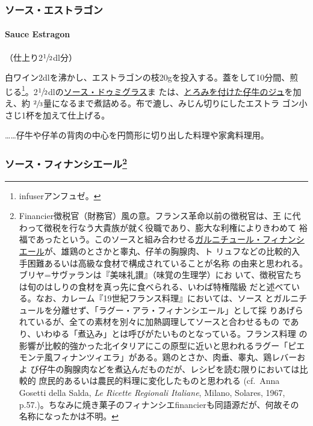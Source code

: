 \documentclass[twoside,12Q,b5j]{escoffierltjsbook}
\renewcommand{\ldots}{…}
\newenvironment{recette}{\begin{small}\begin{spacing}{1}\begin{multicols}{2}}{\end{multicols}\end{spacing}\end{small}}
\begin{document}
\begin{recette}
\vspace*{1.7\zw}

\subsubsection{ソース・エストラゴン}\label{ux30bdux30fcux30b9ux30a8ux30b9ux30c8ux30e9ux30b4ux30f3}

\paragraph{Sauce Estragon}\label{sauce-estragon}


（仕上り2\(\sfrac{1}{2}\)dl分）

白ワイン2dlを沸かし、エストラゴンの枝20gを投入する。蓋をして10分間、煎
じる\footnote{infuserアンフュゼ。}。2\(\sfrac{1}{2}\)dlの\protect\hyperlink{sauce-demi-glace}{ソース・ドゥミグラス}ま
たは、\protect\hyperlink{jus-de-veau-lie}{とろみを付けた仔牛のジュ}を加え、約
\(\sfrac{2}{3}\)量になるまで煮詰める。布で漉し、みじん切りにしたエストラ
ゴン小さじ1杯を加えて仕上げる。

\ldots{}\ldots{}仔牛や仔羊の背肉の中心を円筒形に切り出した料理や家禽料理用。

\vspace*{1.7\zw}

\subsubsection[ソース・フィナンシエール]{\texorpdfstring{ソース・フィナンシエール\footnote{Financier徴税官（財務官）風の意。フランス革命以前の徴税官は、王
  に代わって徴税を行なう大貴族が就く役職であり、膨大な利権によりきわめて
  裕福であったという。このソースと組み合わせる\protect\hyperlink{garniture-financiere}{ガルニチュール・フィナンシ
  エール}が、雄鶏のとさかと睾丸、仔羊の胸腺肉、ト
  リュフなどの比較的入手困難あるいは高級な食材で構成されていることが名称
  の由来と思われる。ブリヤ=サヴァランは『美味礼讃』（味覚の生理学）にお
  いて、徴税官たちは旬のはしりの食材を真っ先に食べられる、いわば特権階級
  だと述べている。なお、カレーム『19世紀フランス料理』においては、ソース
  とガルニチュールを分離せず、「ラグー・アラ・フィナンシエール」として採
  りあげられているが、全ての素材を別々に加熱調理してソースと合わせるもの
  であり、いわゆる「煮込み」とは呼びがたいものとなっている。フランス料理
  の影響が比較的強かった北イタリアにこの原型に近いと思われるラグー「ピエ
  モンテ風フィナンツィエラ」がある。鶏のとさか、肉垂、睾丸、鶏レバーおよ
  び仔牛の胸腺肉などを煮込んだものだが、レシピを読む限りにおいては比較的
  庶民的あるいは農民的料理に変化したものと思われる (cf.~Anna Gosetti
  della Salda, \emph{Le Ricette Regionali Italiane}, Milano, Solares,
  1967,
  p.57.)。ちなみに焼き菓子のフィナンシエfinancierも同語源だが、何故その
  名称になったかは不明。}}{ソース・フィナンシエール}}\label{ux30bdux30fcux30b9ux30d5ux30a3ux30caux30f3ux30b7ux30a8ux30fcux30eb34}


\end{recette}
\end{document}
